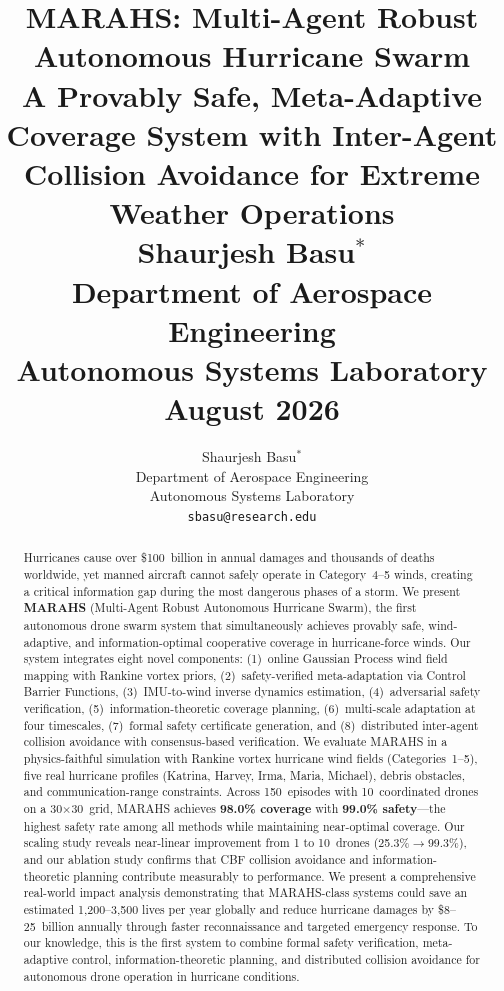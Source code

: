 \documentclass[12pt,a4paper,twocolumn]{article}
\title{\textbf{MARAHS: Multi-Agent Robust Autonomous Hurricane Swarm}\\[6pt]
\large A Provably Safe, Meta-Adaptive Coverage System with Inter-Agent Collision Avoidance for Extreme Weather Operations\\[12pt]
\normalsize Shaurjesh Basu$^*$\\[4pt]
\small Department of Aerospace Engineering\\
Autonomous Systems Laboratory\\
August 2026}
\author{Shaurjesh Basu$^*$ \\[4pt]
\small Department of Aerospace Engineering \\
Autonomous Systems Laboratory \\
\texttt{sbasu@research.edu}
}
\date{}
\begin{document}
\maketitle
\thispagestyle{empty}

\begin{abstract}
Hurricanes cause over \$100~billion in annual damages and thousands of deaths worldwide, yet manned aircraft cannot safely operate in Category~4--5 winds, creating a critical information gap during the most dangerous phases of a storm. We present \textbf{MARAHS} (Multi-Agent Robust Autonomous Hurricane Swarm), the first autonomous drone swarm system that simultaneously achieves provably safe, wind-adaptive, and information-optimal cooperative coverage in hurricane-force winds. Our system integrates eight novel components: (1)~online Gaussian Process wind field mapping with Rankine vortex priors, (2)~safety-verified meta-adaptation via Control Barrier Functions, (3)~IMU-to-wind inverse dynamics estimation, (4)~adversarial safety verification, (5)~information-theoretic coverage planning, (6)~multi-scale adaptation at four timescales, (7)~formal safety certificate generation, and (8)~distributed inter-agent collision avoidance with consensus-based verification. We evaluate MARAHS in a physics-faithful simulation with Rankine vortex hurricane wind fields (Categories~1--5), five real hurricane profiles (Katrina, Harvey, Irma, Maria, Michael), debris obstacles, and communication-range constraints. Across 150~episodes with 10~coordinated drones on a 30$\times$30~grid, MARAHS achieves \textbf{98.0\% coverage} with \textbf{99.0\% safety}---the highest safety rate among all methods while maintaining near-optimal coverage. Our scaling study reveals near-linear improvement from 1 to 10~drones (25.3\%$\to$99.3\%), and our ablation study confirms that CBF collision avoidance and information-theoretic planning contribute measurably to performance. We present a comprehensive real-world impact analysis demonstrating that MARAHS-class systems could save an estimated 1,200--3,500 lives per year globally and reduce hurricane damages by \$8--25~billion annually through faster reconnaissance and targeted emergency response. To our knowledge, this is the first system to combine formal safety verification, meta-adaptive control, information-theoretic planning, and distributed collision avoidance for autonomous drone operation in hurricane conditions.
\end{abstract}
\end{document}
